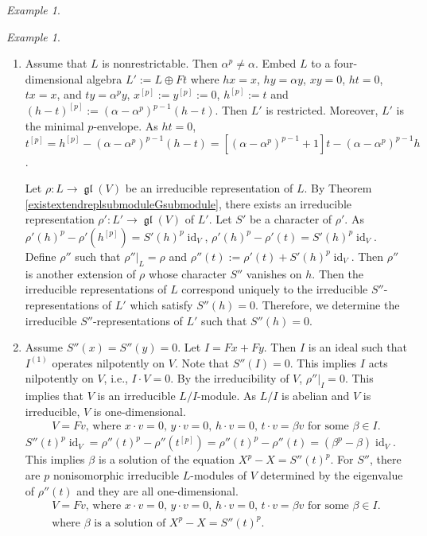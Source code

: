 \documentclass[12pt,MSc]{muthesis_2023}
\theoremstyle{plain}%
\theoremstyle{definition}
\theoremstyle{remark}
\newtheorem{Example}[FactCounter]{Example} %
\DeclareMathOperator{\gl}{\mathfrak{gl}}
\DeclareMathOperator{\id}{id}
\begin{document}
\begin{Example}
\begin{enumerate}
\begin{Example}
\begin{enumerate}
\item[(b)]
Assume that $L$ is nonrestrictable. Then $\alpha^p\neq \alpha$. Embed $L$ to a four-dimensional algebra $L':=L\oplus Ft$ where $hx=x$, $hy=\alpha y$, $xy=0$, $ht=0$, $tx=x$, and $ty=\alpha^py$, $x^{[p]}:=y^{[p]}:=0$, $h^{[p]}:=t$ and $(h-t)^{[p]}:={(\alpha-\alpha^p)}^{p-1}(h-t)$. Then $L'$ is restricted. Moreover, $L'$ is the minimal $p$-envelope. As $ht=0$, $t^{[p]}=h^{[p]}-{(\alpha-\alpha^p)}^{p-1}(h-t)=[{(\alpha-\alpha^p)}^{p-1}+1]t-{(\alpha-\alpha^p)}^{p-1}h$.

Let $\rho: L \rightarrow \gl(V)$ be an irreducible representation of $L$. By Theorem \ref{existextendreplsubmoduleGsubmodule}, there exists an irreducible representation $\rho': L' \rightarrow \gl(V)$ of $L'$. Let $S'$ be a character of $\rho'$. As ${\rho'(h)}^p-\rho'(h^{[p]})={S'(h)}^p\id_V$, ${\rho'(h)}^p-\rho'(t)={S'(h)}^p\id_V$. Define $\rho''$ such that $\rho''|_L=\rho$ and $\rho''(t):=\rho'(t)+{S'(h)}^p\id_V$. Then $\rho''$ is another extension of $\rho$ whose character $S''$ vanishes on $h$. Then the irreducible representations of $L$ correspond uniquely to the irreducible $S''$-representations of $L'$ which satisfy $S''(h)=0$. Therefore, we determine the irreducible $S''$-representations of $L'$ such that $S''(h)=0$.

\item[(b.1)] Assume $S''(x)=S''(y)=0$. Let $I=Fx+Fy$. Then $I$ is an ideal such that $I^{(1)}$ operates nilpotently on $V$. Note that $S''(I)=0$. This implies $I$ acts nilpotently on $V$, i.e., $I\cdot V=0$. By the irreducibility of $V$, $\rho''|_I=0$. This implies that $V$ is an irreducible $L/I$-module. As $L/I$ is abelian and $V$ is irreducible, $V$ is one-dimensional.
\begin{align*}
\text{$V=Fv$, where $x \cdot v=0$, $y\cdot v=0$, $h\cdot v=0$, $t\cdot v=\beta v$ for some $\beta\in I$}.
\end{align*}
${S''(t)}^p\id_V={\rho''(t)}^p-\rho''(t^{[p]})={\rho''(t)}^p-\rho''(t)=(\beta^p-\beta)\id_V$. This implies $\beta$ is a solution of the equation $X^p-X={S''(t)}^p$. For $S''$, there are $p$ nonisomorphic irreducible $L$-modules of $V$ determined by the eigenvalue of $\rho''(t)$ and they are all one-dimensional.
\begin{align*}
\text{$V=Fv$, where $x \cdot v=0$, $y\cdot v=0$, $h\cdot v=0$, $t\cdot v=\beta v$ for some $\beta\in I$}.\\
\text{where $\beta$ is a solution of $X^p-X={S''(t)}^p$.}
\end{align*}


\end{enumerate}
\end{Example}
\end{enumerate}
\end{Example}
\end{document}
